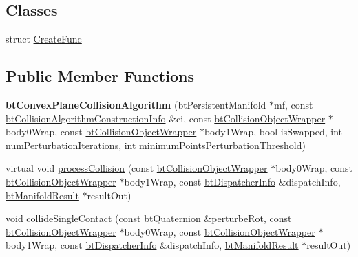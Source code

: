 \subsection*{Classes}
\begin{DoxyCompactItemize}
\item 
struct \hyperlink{structbtConvexPlaneCollisionAlgorithm_1_1CreateFunc}{Create\+Func}
\end{DoxyCompactItemize}
\subsection*{Public Member Functions}
\begin{DoxyCompactItemize}
\item 
\mbox{\label{classbtConvexPlaneCollisionAlgorithm_a60f101519c99326f756d07e1218291ca}} 
{\bfseries bt\+Convex\+Plane\+Collision\+Algorithm} (bt\+Persistent\+Manifold $\ast$mf, const \hyperlink{structbtCollisionAlgorithmConstructionInfo}{bt\+Collision\+Algorithm\+Construction\+Info} \&ci, const \hyperlink{structbtCollisionObjectWrapper}{bt\+Collision\+Object\+Wrapper} $\ast$body0\+Wrap, const \hyperlink{structbtCollisionObjectWrapper}{bt\+Collision\+Object\+Wrapper} $\ast$body1\+Wrap, bool is\+Swapped, int num\+Perturbation\+Iterations, int minimum\+Points\+Perturbation\+Threshold)
\item 
virtual void \hyperlink{classbtConvexPlaneCollisionAlgorithm_ace95b966a346d00f7666549220f6afb8}{process\+Collision} (const \hyperlink{structbtCollisionObjectWrapper}{bt\+Collision\+Object\+Wrapper} $\ast$body0\+Wrap, const \hyperlink{structbtCollisionObjectWrapper}{bt\+Collision\+Object\+Wrapper} $\ast$body1\+Wrap, const \hyperlink{structbtDispatcherInfo}{bt\+Dispatcher\+Info} \&dispatch\+Info, \hyperlink{classbtManifoldResult}{bt\+Manifold\+Result} $\ast$result\+Out)
\item 
void \hyperlink{classbtConvexPlaneCollisionAlgorithm_a79f8384fcdc2145be9fca0057edc8b69}{collide\+Single\+Contact} (const \hyperlink{classbtQuaternion}{bt\+Quaternion} \&perturbe\+Rot, const \hyperlink{structbtCollisionObjectWrapper}{bt\+Collision\+Object\+Wrapper} $\ast$body0\+Wrap, const \hyperlink{structbtCollisionObjectWrapper}{bt\+Collision\+Object\+Wrapper} $\ast$body1\+Wrap, const \hyperlink{structbtDispatcherInfo}{bt\+Dispatcher\+Info} \&dispatch\+Info, \hyperlink{classbtManifoldResult}{bt\+Manifold\+Result} $\ast$result\+Out)
\item 
\mbox{\label{classbtConvexPlaneCollisionAlgorithm_ad72bfddcee82521487ca61227d6d2073}} 

\end{DoxyCompactItemize}
